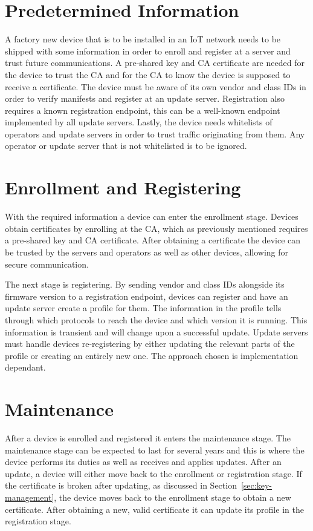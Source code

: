 \documentclass[0-thesis.tex]{subfiles}
\begin{document}
\section{Predetermined Information}
\label{sec:predetermined-information}
A factory new device that is to be installed in an IoT network needs to be shipped with
some information in order to enroll and register at a server and trust future
communications. A pre-shared key and CA certificate are needed for the device to trust the
CA and for the CA to know the device is supposed to receive a certificate. The device must
be aware of its own vendor and class IDs in order to verify manifests and register at an
update server. Registration also requires a known registration endpoint, this can be a
well-known endpoint implemented by all update servers. Lastly, the device needs whitelists
of operators and update servers in order to trust traffic originating from them. Any
operator or update server that is not whitelisted is to be ignored.

\section{Enrollment and Registering}
\label{sec:enrollment-registering}
With the required information a device can enter the enrollment stage. Devices obtain
certificates by enrolling at the CA, which as previously mentioned requires a pre-shared
key and CA certificate. After obtaining a certificate the device can be trusted by the
servers and operators as well as other devices, allowing for secure communication.

The next stage is registering. By sending vendor and class IDs alongside its firmware
version to a registration endpoint, devices can register and have an update server create
a profile for them. The information in the profile tells through which protocols to reach
the device and which version it is running. This information is transient and will change
upon a successful update. Update servers must handle devices re-registering by either
updating the relevant parts of the profile or creating an entirely new one. The approach
chosen is implementation dependant.

\section{Maintenance}
\label{sec:maintenance}
After a device is enrolled and registered it enters the maintenance stage. The maintenance
stage can be expected to last for several years and this is where the device performs its
duties as well as receives and applies updates. After an update, a device will either move
back to the enrollment or registration stage. If the certificate is broken after updating,
as discussed in Section~\ref{sec:key-management}, the device moves back to the enrollment
stage to obtain a new certificate. After obtaining a new, valid certificate it can update
its profile in the registration stage. 
\end{document}
